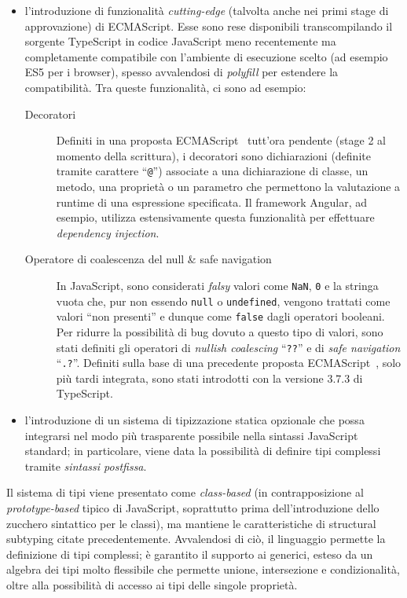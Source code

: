       \begin{itemize}
        \item
          l'introduzione di funzionalità \emph{cutting-edge} (talvolta anche nei primi stage di approvazione) di ECMAScript.
          Esse sono rese disponibili transcompilando il sorgente TypeScript in codice JavaScript meno recentemente ma completamente compatibile con l'ambiente di esecuzione scelto
          (ad esempio ES5 per i browser), spesso avvalendosi di \emph{polyfill} per estendere la compatibilità.
          Tra queste funzionalità, ci sono ad esempio:
          \begin{description}
            \item[Decoratori]
              Definiti in una proposta ECMAScript~\cite{decorators} tutt'ora pendente (stage 2 al momento della scrittura),
              i decoratori sono dichiarazioni (definite tramite carattere ``\texttt{@}'') associate a una dichiarazione di classe, un metodo, una proprietà o un parametro che permettono la valutazione a runtime di una espressione specificata.
              Il framework Angular, ad esempio, utilizza estensivamente questa funzionalità per effettuare \emph{dependency injection}.

            \item[Operatore di coalescenza del null \& safe navigation]
              In JavaScript, sono considerati \emph{falsy} valori come \texttt{NaN}, \texttt{0} e la stringa vuota che, pur non essendo \texttt{null} o \texttt{undefined},
              vengono trattati come valori ``non presenti'' e dunque come \texttt{false} dagli operatori booleani.
              Per ridurre la possibilità di bug dovuto a questo tipo di valori, sono stati definiti gli operatori di \emph{nullish coalescing} ``\texttt{??}'' e di \emph{safe navigation} ``\texttt{.?}''.
              Definiti sulla base di una precedente proposta ECMAScript~\cite{optional}, solo più tardi integrata, sono stati introdotti con la versione 3.7.3 di TypeScript.
          \end{description}
        \item
          l'introduzione di un sistema di tipizzazione statica opzionale che possa integrarsi nel modo più trasparente possibile nella sintassi JavaScript standard;
          in particolare, viene data la possibilità di definire tipi complessi tramite \emph{sintassi postfissa}.
      \end{itemize}

      Il sistema di tipi viene presentato come \emph{class-based} (in contrapposizione al \emph{prototype-based} tipico di JavaScript, soprattutto prima dell'introduzione dello zucchero sintattico per le classi), ma mantiene le caratteristiche di structural subtyping citate precedentemente.
      Avvalendosi di ciò, il linguaggio permette la definizione di tipi complessi;
      è garantito il supporto ai generici, esteso da un algebra dei tipi molto flessibile che permette unione, intersezione e condizionalità, oltre alla possibilità di accesso ai tipi delle singole proprietà.

